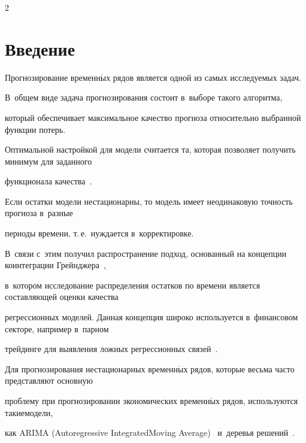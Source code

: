 \begin{multicols}{2}



\label{st\stat}

    



\section{Введение}






Прогнозирование временн$\acute{\mbox{ы}}$х рядов является одной из самых исследуемых задач. 

В~общем виде задача прогнозирования состоит в~выборе такого алгоритма, 

который обеспечивает максимальное качество прогноза относительно выбранной функции потерь. 

Оптимальной настройкой для модели считается та, которая позволяет получить минимум для заданного 

функционала качества~\cite{1-kr}.



Если остатки модели нестационарны, то модель имеет неодинаковую точность прогноза в~разные 

периоды времени, т.\,е.\ нуждается в~корректировке. 

В~связи с~этим получил распространение подход, основанный на концепции коинтеграции Грейнд\-же\-ра~\cite{2-kr}, 

в~котором исследование распределения остатков по времени является составляющей оценки качества 

регрессионных моделей. Данная концепция широко используется в~финансовом секторе, например в~парном 

трейдинге для выявления ложных регрессионных связей~\cite{3-kr}.



Для прогнозирования нестационарных вре\-мен\-н$\acute{\mbox{ы}}$х рядов, которые весьма часто пред\-став\-ля\-ют основную 

проб\-ле\-му при прогнозировании экономических вре\-мен\-н$\acute{\mbox{ы}}$х рядов, используются такие\linebreak модели,

 как \mbox{ARIMA} (Autoregressive Integrated\linebreak Moving Average)~\cite{4-kr, 5-kr} и~деревья решений~\cite{6-kr, 7-kr}. 


\end{multicols}
